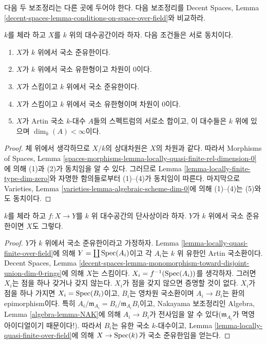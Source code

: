 \noindent
다음 두 보조정리는 다른 곳에 두어야 한다. 다음 보조정리를 Decent
Spaces, Lemma \ref{decent-spaces-lemma-conditions-on-space-over-field}와
비교하라.

\begin{lemma}
\label{lemma-locally-quasi-finite-over-field}
$k$를 체라 하고 $X$를 $k$ 위의 대수공간이라 하자. 다음 조건들은
서로 동치이다.
\begin{enumerate}
\item $X$가 $k$ 위에서 국소 준유한이다.
\item $X$가 $k$ 위에서 국소 유한형이고 차원이 $0$이다.
\item $X$가 스킴이고 $k$ 위에서 국소 준유한이다.
\item $X$가 스킴이고 $k$ 위에서 국소 유한형이며 차원이 $0$이다.
\item $X$가 Artin 국소 $k$-대수 $A$들의 스펙트럼의 서로소 합이고,
이 대수들은 $k$ 위에 있으며 $\dim_k(A) < \infty$이다.
\end{enumerate}
\end{lemma}

\begin{proof}
체 위에서 생각하므로 $X/k$의 상대차원은 $X$의 차원과 같다.
따라서 Morphisms of Spaces, Lemma
\ref{spaces-morphisms-lemma-locally-quasi-finite-rel-dimension-0}에 의해
(1)과 (2)가 동치임을 알 수 있다. 그러므로 Lemma
\ref{lemma-locally-finite-type-dim-zero}와 자명한 함의들로부터 (1)--(4)가
동치임이 따른다. 마지막으로 Varieties, Lemma
\ref{varieties-lemma-algebraic-scheme-dim-0}에 의해 (1)--(4)는 (5)와도
동치이다.
\end{proof}

\begin{lemma}
\label{lemma-mono-towards-locally-quasi-finite-over-field}
$k$를 체라 하고 $f : X \to Y$를 $k$ 위 대수공간의 단사상이라 하자.
$Y$가 $k$ 위에서 국소 준유한이면 $X$도 그렇다.
\end{lemma}

\begin{proof}
$Y$가 $k$ 위에서 국소 준유한이라고 가정하자. Lemma
\ref{lemma-locally-quasi-finite-over-field}에 의해
$Y = \coprod \mathop{\mathrm{Spec}}(A_i)$이고 각 $A_i$는 $k$ 위 유한인 Artin
국소환이다. Decent Spaces, Lemma
\ref{decent-spaces-lemma-monomorphism-toward-disjoint-union-dim-0-rings}에
의해 $X$는 스킴이다. $X_i = f^{-1}(\mathop{\mathrm{Spec}}(A_i))$를 생각하자. 그러면
$X_i$는 점을 하나 갖거나 갖지 않는다. $X_i$가 점을 갖지 않으면
증명할 것이 없다. $X_i$가 점을 하나 가지면 $X_i = \mathop{\mathrm{Spec}}(B_i)$이고,
$B_i$는 영차원 국소환이며 $A_i \to B_i$는 환의 epimorphism이다.
특히 $A_i/\mathfrak m_{A_i} = B_i/\mathfrak m_{A_i}B_i$이고, Nakayama
보조정리인 Algebra, Lemma \ref{algebra-lemma-NAK}에 의해
$A_i \to B_i$가 전사임을 알 수 있다($\mathfrak m_{A_i}$가 멱영
아이디얼이기 때문이다!). 따라서 $B_i$는 유한 국소 $k$-대수이고,
Lemma \ref{lemma-locally-quasi-finite-over-field}에 의해
$X \to \mathop{\mathrm{Spec}}(k)$가 국소 준유한임을 얻는다.
\end{proof}

